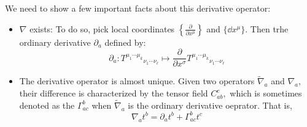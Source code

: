 \documentclass{article}
\numberwithin{equation}{section}
\begin{document}
We need to show a few important facts about this derivative operator:
\begin{itemize}
    \item $\nabla$ exists: To do so, pick local coordinates $\left\{\frac{\partial}{\partial x^\mu}\right\}$ and $\{\dd{x}^\mu\}.$ Then trhe ordinary derivative $\partial_a$ defined by:
    \begin{equation*}
        \partial_a: T^{\mu_1\cdots \mu_k}{}_{\nu_1\cdots \nu_\ell} \mapsto \frac{\partial}{\partial x^\sigma}T^{\mu_1\cdots\mu_k}{}_{\nu_1\cdots\nu_\ell}
    \end{equation*}
    \item The derivative operator is almost unique. Given two operators $\tilde{\nabla}_a$ and $\nabla_a,$ their difference is characterized by the tensor field $C^c_{ab},$ which is sometimes denoted as the  $\Gamma^{b}_{ac}$ when $\tilde{\nabla}_a$ is the ordinary derivative oeprator. That is,
    \begin{equation*}
        \nabla_a t^b = \partial_a t^b + \Gamma^b_{ac}t^c
    \end{equation*}
\end{itemize}
\end{document}
